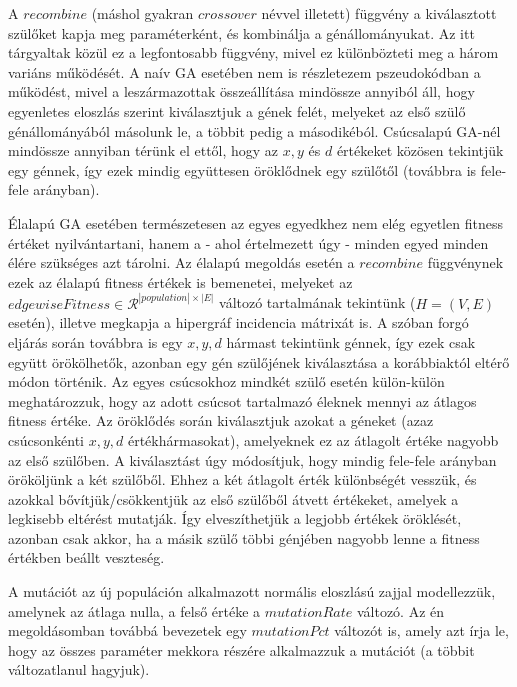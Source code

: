 A $recombine$ (máshol gyakran $crossover$ névvel illetett) függvény a kiválasztott szülőket kapja meg paraméterként, és kombinálja a génállományukat. Az itt tárgyaltak közül ez a legfontosabb függvény, mivel ez különbözteti meg a három variáns működését. A naív GA esetében nem is részletezem pszeudokódban a működést, mivel a leszármazottak összeállítása mindössze annyiból áll, hogy egyenletes eloszlás szerint kiválasztjuk a gének felét, melyeket az első szülő génállományából másolunk le, a többit pedig a másodikéból. Csúcsalapú GA-nél mindössze annyiban térünk el ettől, hogy az $x,y$ és $d$ értékeket közösen tekintjük egy génnek, így ezek mindig együttesen öröklődnek egy szülőtől (továbbra is fele-fele arányban).


Élalapú GA esetében természetesen az egyes egyedkhez nem elég egyetlen fitness értéket nyilvántartani, hanem a - ahol értelmezett úgy - minden egyed minden élére szükséges azt tárolni. Az élalapú megoldás esetén a $recombine$ függvénynek ezek az élalapú fitness értékek is bemenetei, melyeket az $edgewiseFitness \in \mathcal{R}^{|population| \times |E|}$ változó tartalmának tekintünk ($H=(V,E)$ esetén), illetve megkapja a hipergráf incidencia mátrixát is. A szóban forgó eljárás során továbbra is egy $x,y,d$ hármast tekintünk génnek, így ezek csak együtt örökölhetők, azonban egy gén szülőjének kiválasztása a korábbiaktól eltérő módon történik. Az egyes csúcsokhoz mindkét szülő esetén külön-külön meghatározzuk, hogy az adott csúcsot tartalmazó éleknek mennyi az átlagos fitness értéke. Az öröklődés során kiválasztjuk azokat a géneket (azaz csúcsonkénti $x,y,d$ értékhármasokat), amelyeknek ez az átlagolt értéke nagyobb az első szülőben. A kiválasztást úgy módosítjuk, hogy mindig fele-fele arányban örököljünk a két szülőből. Ehhez a két átlagolt érték különbségét vesszük, és azokkal bővítjük/csökkentjük az első szülőből átvett értékeket, amelyek a legkisebb eltérést mutatják. Így elveszíthetjük a legjobb értékek öröklését, azonban csak akkor, ha a másik szülő többi génjében nagyobb lenne a fitness értékben beállt veszteség.


A mutációt az új populáción alkalmazott normális eloszlású zajjal modellezzük, amelynek az átlaga nulla, a felső értéke a $mutationRate$ változó. Az én megoldásomban továbbá bevezetek egy $mutationPct$ változót is, amely azt írja le, hogy az összes paraméter mekkora részére alkalmazzuk a mutációt (a többit változatlanul hagyjuk).



